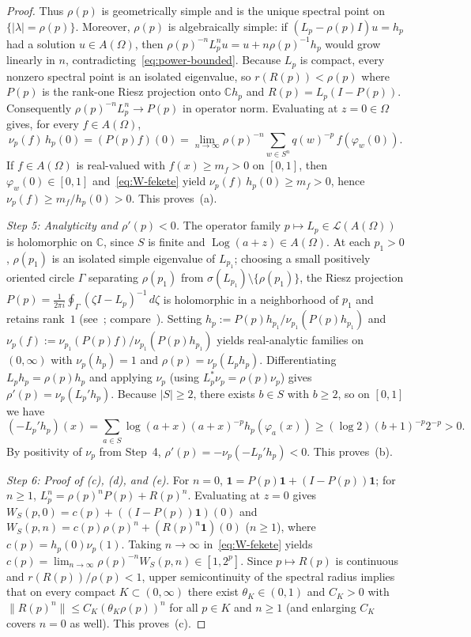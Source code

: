 \documentclass[11pt]{article}
\theoremstyle{definition}
\theoremstyle{remark}
\newcommand{\C}{\mathbb{C}}
\begin{document}
\begin{proof}
Thus $\rho(p)$ is geometrically simple and is the unique spectral point on
$\{|\lambda|=\rho(p)\}$. Moreover, $\rho(p)$ is algebraically simple: if
$(L_p-\rho(p)I)u=h_p$ had a solution $u\in A(\Omega)$, then
$\rho(p)^{-n}L_p^n u = u + n\rho(p)^{-1}h_p$ would grow linearly in $n$,
contradicting~\eqref{eq:power-bounded}. Because $L_p$ is compact, every
nonzero spectral point is an isolated eigenvalue, so $r(R(p))<\rho(p)$ where
$P(p)$ is the rank-one Riesz projection onto $\C h_p$ and $R(p)=L_p(I-P(p))$.
Consequently $\rho(p)^{-n}L_p^n\to P(p)$ in operator norm. Evaluating at
$z=0\in\Omega$ gives, for every $f\in A(\Omega)$,
\[
\nu_p(f)\,h_p(0)=(P(p)f)(0)
=\lim_{n\to\infty}\rho(p)^{-n}\sum_{w\in S^n}q(w)^{-p}\,f(\varphi_w(0)).
\]
If $f\in A(\Omega)$ is real-valued with $f(x)\ge m_f>0$ on $[0,1]$, then
$\varphi_w(0)\in[0,1]$ and~\eqref{eq:W-fekete} yield
$\nu_p(f)\,h_p(0)\ge m_f>0$, hence $\nu_p(f)\ge m_f/h_p(0)>0$. This proves~(a).

\emph{Step 5: Analyticity and $\rho'(p)<0$.}
The operator family $p\mapsto L_p\in\mathcal L(A(\Omega))$ is holomorphic on
$\C$, since $S$ is finite and $\operatorname{Log}(a+z)\in A(\Omega)$.
At each $p_1>0$, $\rho(p_1)$ is an isolated simple eigenvalue of $L_{p_1}$;
choosing a small positively oriented circle $\Gamma$ separating $\rho(p_1)$
from $\sigma(L_{p_1})\setminus\{\rho(p_1)\}$, the Riesz projection
$P(p)=\frac{1}{2\pi i}\oint_\Gamma(\zeta I-L_p)^{-1}\,d\zeta$ is holomorphic
in a neighborhood of $p_1$ and retains rank~$1$ (see~\cite[Ch.~VII, \S1.3]{Kato1995};
compare~\cite{Mayer1990,JP2018}). Setting
$h_p:=P(p)h_{p_1}/\nu_{p_1}(P(p)h_{p_1})$ and
$\nu_p(f):=\nu_{p_1}(P(p)f)/\nu_{p_1}(P(p)h_{p_1})$ yields real-analytic
families on $(0,\infty)$ with $\nu_p(h_p)=1$ and $\rho(p)=\nu_p(L_p h_p)$.
Differentiating $L_p h_p=\rho(p)h_p$ and applying $\nu_p$ (using
$L_p^*\nu_p=\rho(p)\nu_p$) gives $\rho'(p)=\nu_p(L_p'h_p)$. Because
$|S|\ge2$, there exists $b\in S$ with $b\ge2$, so on $[0,1]$ we have
\[
(-L_p'h_p)(x)=\sum_{a\in S}\log(a+x)(a+x)^{-p}h_p(\varphi_a(x))
\ge(\log 2)(b+1)^{-p}2^{-p}>0.
\]
By positivity of $\nu_p$ from Step~4, $\rho'(p)=-\nu_p(-L_p'h_p)<0$. This
proves~(b).

\emph{Step 6: Proof of (c), (d), and (e).}
For $n=0$, $\mathbf 1=P(p)\mathbf 1+(I-P(p))\mathbf 1$; for $n\ge1$,
$L_p^n=\rho(p)^nP(p)+R(p)^n$. Evaluating at $z=0$ gives
$W_S(p,0)=c(p)+((I-P(p))\mathbf 1)(0)$ and
$W_S(p,n)=c(p)\rho(p)^n+(R(p)^n\mathbf 1)(0)$ ($n\ge1$), where
$c(p)=h_p(0)\nu_p(1)$. Taking $n\to\infty$ in~\eqref{eq:W-fekete} yields
$c(p)=\lim_{n\to\infty}\rho(p)^{-n}W_S(p,n)\in[1,2^p]$. Since
$p\mapsto R(p)$ is continuous and $r(R(p))/\rho(p)<1$, upper semicontinuity
of the spectral radius implies that on every compact $K\subset(0,\infty)$
there exist $\theta_K\in(0,1)$ and $C_K>0$ with
$\|R(p)^n\|\le C_K(\theta_K\rho(p))^n$ for all $p\in K$ and $n\ge1$ (and
enlarging $C_K$ covers $n=0$ as well). This proves~(c).


\end{proof}
\end{document}
